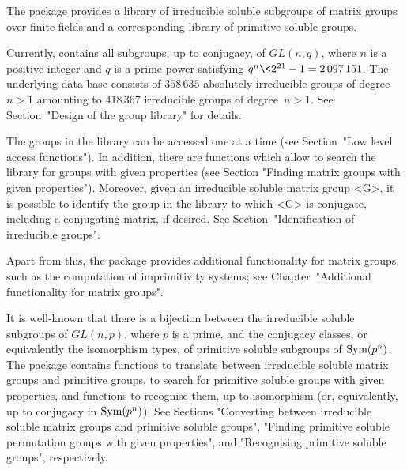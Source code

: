 



The package {\IRREDSOL} provides a library of irreducible
soluble subgroups of matrix groups over finite fields and a corresponding library of primitive soluble groups.

Currently, {\IRREDSOL} contains all subgroups, up to conjugacy, of $GL(n, q)$, 
where $n$ is a positive integer and $q$
is a prime power satisfying  $q^n \< 2^{21} - 1 = 2\,097\,151$. The underlying data base consists of 
$358\,635$ absolutely irreducible groups of degree $n > 1$ amounting to $418\,367$ irreducible groups of degree~$n>1$. See Section~"Design of the group library" for details.

The groups in the {\IRREDSOL} 
library can be accessed one at a time (see Section~"Low
level access functions"). In addition, there are functions which allow to 
search the library for groups with given properties (see Section "Finding
matrix groups with given properties"). Moreover, given an irreducible soluble matrix group
<G>, it is possible to identify the group in the library to which <G> is conjugate,
including a conjugating matrix, if desired. See Section~"Identification of irreducible
groups".

Apart from this, the {\IRREDSOL} package provides additional functionality
for matrix groups, such as the computation of imprimitivity systems;
see Chapter~"Additional functionality for matrix groups".

It is well-known that there is a bijection between the  irreducible soluble subgroups of
$GL(n, p)$, where
$p$ is a prime, and the conjugacy classes, or equivalently the isomorphism types, of
primitive soluble subgroups of ${\rm Sym}(p^n)$. The {\IRREDSOL} package contains
functions to translate between irreducible soluble matrix groups and primitive
groups, to search for primitive soluble groups with given  properties, and functions to
recognise them, up to isomorphism (or, equivalently, up to conjugacy in ${\rm Sym}(p^n)$).  See Sections "Converting between irreducible soluble
matrix groups and primitive soluble groups", "Finding primitive soluble permutation
groups with given properties", and "Recognising primitive soluble groups", respectively.

